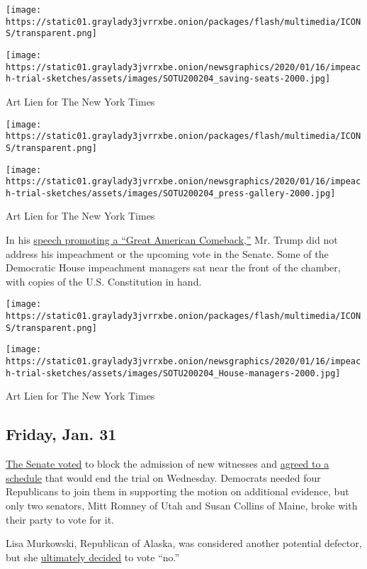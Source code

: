 \texttt{[image: https://static01.graylady3jvrrxbe.onion/packages/flash/multimedia/ICONS/transparent.png]}

\texttt{[image: https://static01.graylady3jvrrxbe.onion/newsgraphics/2020/01/16/impeach-trial-sketches/assets/images/SOTU200204\_saving-seats-2000.jpg]}

Art Lien for The New York Times

\texttt{[image: https://static01.graylady3jvrrxbe.onion/packages/flash/multimedia/ICONS/transparent.png]}

\texttt{[image: https://static01.graylady3jvrrxbe.onion/newsgraphics/2020/01/16/impeach-trial-sketches/assets/images/SOTU200204\_press-gallery-2000.jpg]}

Art Lien for The New York Times

In his
\href{https://www.nytimes3xbfgragh.onion/2020/02/04/us/politics/state-of-the-union-address.html}{speech
promoting a ``Great American Comeback,''} Mr. Trump did not address his
impeachment or the upcoming vote in the Senate. Some of the Democratic
House impeachment managers sat near the front of the chamber, with
copies of the U.S. Constitution in hand.

\texttt{[image: https://static01.graylady3jvrrxbe.onion/packages/flash/multimedia/ICONS/transparent.png]}

\texttt{[image: https://static01.graylady3jvrrxbe.onion/newsgraphics/2020/01/16/impeach-trial-sketches/assets/images/SOTU200204\_House-managers-2000.jpg]}

Art Lien for The New York Times

\hypertarget{friday-jan-31}{%
\subsection{Friday, Jan. 31}\label{friday-jan-31}}

\href{https://www.nytimes3xbfgragh.onion/interactive/2020/01/31/us/politics/impeachment-vote.html?action=click\&module=Spotlight\&pgtype=Homepage}{The
Senate voted} to block the admission of new witnesses and
\href{https://www.nytimes3xbfgragh.onion/live/2020/trump-impeachment-trial-01-31?action=click\&module=Spotlight\&pgtype=Homepage\#senators-schedule-trial}{agreed
to a schedule} that would end the trial on Wednesday. Democrats needed
four Republicans to join them in supporting the motion on additional
evidence, but only two senators, Mitt Romney of Utah and Susan Collins
of Maine, broke with their party to vote for it.

Lisa Murkowski, Republican of Alaska, was considered another potential
defector, but she
\href{https://www.nytimes3xbfgragh.onion/live/2020/trump-impeachment-trial-01-31\#murkowski-witnesses}{ultimately
decided} to vote ``no.''

